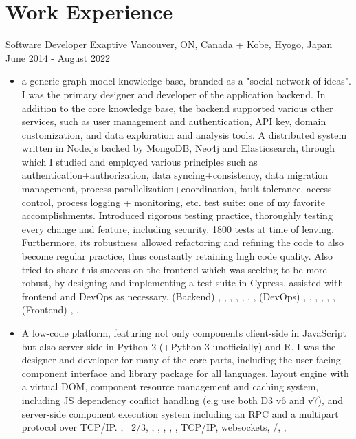 \section{Work Experience}

\cventry
  {Software Developer} %
  {Exaptive} %
  {Vancouver, ON, Canada + Kobe, Hyogo, Japan} %
  {June 2014 - August 2022} %
  {
    \begin{itemize} %
      \liststyle
      \item { a generic graph-model knowledge base, branded as a "social network of ideas".
        I was the primary designer and developer of the application backend.
        In addition to the core knowledge base, the backend supported various other services, 
        such as user management and authentication, API key, domain customization, and data exploration and analysis tools.
        A distributed system written in Node.js backed by MongoDB, Neo4j and Elasticsearch, through which I studied and employed various principles such as 
        authentication+authorization, 
        data syncing+consistency, 
        data migration management,
        process parallelization+coordination, 
        fault tolerance, 
        access control, 
        process logging + monitoring, 
        etc.
        \tgsubitem test suite: one of my favorite accomplishments. Introduced rigorous testing practice, thoroughly testing every change and feature, including security. 
        1800 tests at time of leaving. 
        Furthermore, its robustness allowed refactoring and refining the code to also become regular practice, thus constantly retaining high code quality. 
        Also tried to share this success on the frontend which was seeking to be more robust, by designing and implementing a test suite in Cypress.
        \tgsubitem assisted with frontend and DevOps as necessary. 
        \tgskills (Backend) \rfnodejs, \rfmongodb, \rfneofj, \rfredis, \rfelastic, \rfbash, \rfdocker, 
        (DevOps) \rfjenkins, \rfaws, \rfansible, \rfterraform, \rfnewrelic, \rfsumologic,
        (Frontend) \rftypescript, \rfreact, \rfcypress
      }

      \item {
         A low-code platform, featuring not only components client-side in JavaScript but also server-side in Python 2 (+Python 3 unofficially) and R.
        I was the designer and developer for many of the core parts, including 
        the user-facing component interface and library package for all languages, 
        layout engine with a virtual DOM,
        component resource management and caching system, including JS dependency conflict handling (e.g use both D3 v6 and v7),
        and 
        server-side component execution system including an RPC and a multipart protocol over TCP/IP.
        \tgskills  \rfjavascript, \rfpython\ 2/3, \rfclang, \rfphp, \rfmysql, \rfredis, \rfdocker, TCP/IP, websockets, \rfhtml/\rfcss, \rfaws, \rfdthree
      }
    \end{itemize}
  }

